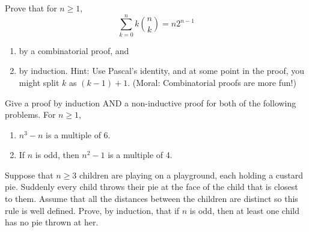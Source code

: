 \documentclass[12pt,letterpaper]{hmcpset}
\begin{document}
\begin{problem}[6]
    Prove that for $n\geq1$, 
    \[
        \sum_{k=0}^{n}k\binom{n}{k}=n2^{n-1}
    \]
    \begin{enumerate}
        \item by a combinatorial proof, and
        \item  by induction. Hint: Use Pascal's identity, and at some point in the proof, you might split $k$ as $(k -1)+1$. (Moral: Combinatorial proofs are more fun!)
    \end{enumerate}
\end{problem}
\begin{solution}
    \vfill
\end{solution}
\newpage

\begin{problem}[7]
    Give a proof by induction AND a non-inductive proof for both of the
following problems. For $n\geq1$,
    \begin{enumerate}
        \item $n^3-n$ is a multiple of 6.
        \item If $n$ is odd, then $n^2-1$ is a multiple of 4.
    \end{enumerate}
\end{problem}
\begin{solution}
    \vfill
\end{solution}
\newpage

\begin{problem}[8]
    Suppose that $n\geq3$ children are playing on a playground, each holding a custard pie. Suddenly every child throws their pie at the face of the child that is closest to them. Assume that all the distances between the children are distinct so this rule is well defined. Prove, by induction, that if $n$ is odd, then at least one child has no pie thrown at her.
\end{problem}
\begin{solution}
    \vfill
\end{solution}
\end{document}
